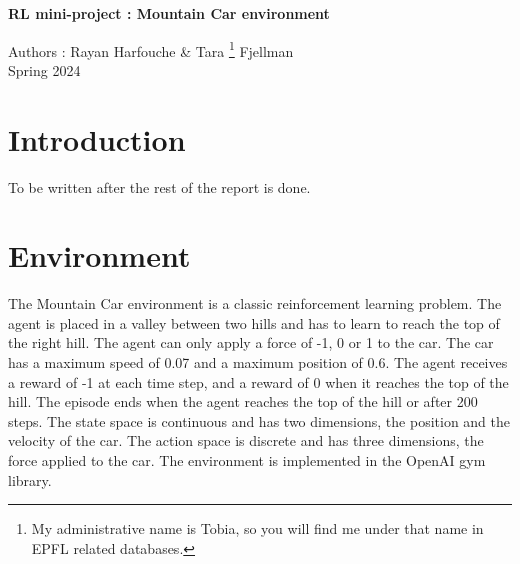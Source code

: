 \documentclass[a4paper, 12pt,oneside]{article}
\begin{document}
 
	\begin{center}
	    \Large
	    \textbf{RL mini-project : Mountain Car environment}
	        
	    \vspace{0.4cm}
	    \large
	    Authors : Rayan Harfouche \& Tara \footnote[1]{My administrative name is Tobia, so you will find me under that name in EPFL related databases.} Fjellman \\
	    \small{Spring 2024}
	\end{center}

    \section{Introduction}
        To be written after the rest of the report is done.

    \section{Environment}
        The Mountain Car environment is a classic reinforcement learning problem. The agent is placed in a valley between two hills and has to learn to reach the top of the right hill. The agent can only apply a force of -1, 0 or 1 to the car. The car has a maximum speed of 0.07 and a maximum position of 0.6. The agent receives a reward of -1 at each time step, and a reward of 0 when it reaches the top of the hill. The episode ends when the agent reaches the top of the hill or after 200 steps. The state space is continuous and has two dimensions, the position and the velocity of the car. The action space is discrete and has three dimensions, the force applied to the car. The environment is implemented in the OpenAI gym library.
\end{document}
